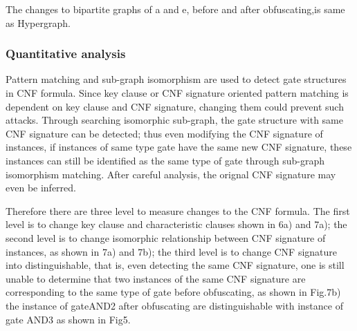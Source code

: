 \documentclass[runningheads,a4paper]{llncs}
\begin{document}
The changes to bipartite graphs of a and e, before and after obfuscating,is same as Hypergraph. 



\subsubsection{Quantitative analysis} 

Pattern matching and sub-graph isomorphism are used to detect gate structures in CNF formula.
Since key clause or CNF signature oriented pattern matching is dependent on key clause and CNF signature, changing them could prevent such attacks.
Through searching isomorphic sub-graph, the gate structure with same CNF signature can be detected; thus even modifying the CNF signature of instances, 
if instances of same type gate have the same new CNF signature, these instances can still be identified as the same type of gate through sub-graph isomorphism matching.
After careful analysis, the orignal CNF signature may even be inferred. 

Therefore there are three level to measure changes to the CNF formula.
The first level is to change key clause and characteristic clauses shown in 6a) and 7a);
the second level is to change isomorphic relationship between CNF signature of instances, as shown in 7a) and 7b);
the third level is to change CNF signature into distinguishable, 
that is, even detecting the same CNF signature, 
one is still unable to determine that two instances of the same CNF signature are corresponding to the same type of gate before obfuscating,
as shown in Fig.7b) the instance of gateAND2 after obfuscating are distinguishable with instance of gate AND3 as shown in Fig5.
\end{document}
